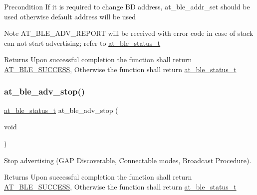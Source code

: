 \begin{DoxyPrecond}{Precondition}
If it is required to change BD address, at\+\_\+ble\+\_\+addr\+\_\+set should be used otherwise default address will be used
\end{DoxyPrecond}
\begin{DoxyNote}{Note}
A\+T\+\_\+\+B\+L\+E\+\_\+\+A\+D\+V\+\_\+\+R\+E\+P\+O\+RT will be received with error code in case of stack can not start advertising; refer to \mbox{\hyperlink{at__ble__api_8h_ace24eb4e5ca3f325c663b809da5feb92}{at\+\_\+ble\+\_\+status\+\_\+t}}
\end{DoxyNote}
\begin{DoxyReturn}{Returns}
Upon successful completion the function shall return \mbox{\hyperlink{group__error__codes__group_gga3b1db9b95feb157b3c188ca27fe76988a7e3bfff5387331cd4f2c56cbcbbd7e19}{A\+T\+\_\+\+B\+L\+E\+\_\+\+S\+U\+C\+C\+E\+SS}}, Otherwise the function shall return \mbox{\hyperlink{at__ble__api_8h_ace24eb4e5ca3f325c663b809da5feb92}{at\+\_\+ble\+\_\+status\+\_\+t}} 
\end{DoxyReturn}
\mbox{\label{group__gap__adv__group_ga1a6b3d740eb88e63553f794fd59ffbc3}} 
\subsubsection{\texorpdfstring{at\_ble\_adv\_stop()}{at\_ble\_adv\_stop()}}
{\footnotesize\ttfamily \mbox{\hyperlink{group__error__codes__group_ga3b1db9b95feb157b3c188ca27fe76988}{at\+\_\+ble\+\_\+status\+\_\+t}} at\+\_\+ble\+\_\+adv\+\_\+stop (\begin{DoxyParamCaption}\item[{void}]{ }\end{DoxyParamCaption})}



Stop advertising (G\+AP Discoverable, Connectable modes, Broadcast Procedure). 

\begin{DoxyReturn}{Returns}
Upon successful completion the function shall return \mbox{\hyperlink{group__error__codes__group_gga3b1db9b95feb157b3c188ca27fe76988a7e3bfff5387331cd4f2c56cbcbbd7e19}{A\+T\+\_\+\+B\+L\+E\+\_\+\+S\+U\+C\+C\+E\+SS}}, Otherwise the function shall return \mbox{\hyperlink{at__ble__api_8h_ace24eb4e5ca3f325c663b809da5feb92}{at\+\_\+ble\+\_\+status\+\_\+t}} 
\end{DoxyReturn}
\mbox{\label{group__gap__adv__group_gadcd0d72189caecac9bc807d9378d33b0}} 
